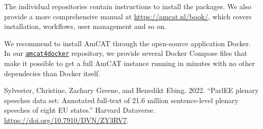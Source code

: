 \documentclass[
  a4paper,
  DIV=11,
  numbers=noendperiod]{scrartcl}
\newlength{\cslhangindent}
\newlength{\cslentryspacingunit} %
\newenvironment{CSLReferences}[2] %
 {%
  \setlength{\parindent}{0pt}
  \ifodd #1
  \let\oldpar\par
  \def\par{\hangindent=\cslhangindent\oldpar}
  \fi
  \setlength{\parskip}{#2\cslentryspacingunit}
 }%
 {}
\begin{document}
The individual repositories contain instructions to install the
packages. We also provide a more comprehensive manual at
\url{https://amcat.nl/book/}, which covers installation, workflows, user
management and so on.

We recommend to install AmCAT through the open-source application
Docker. In our
\href{https://github.com/ccs-amsterdam/amcat4docker}{\texttt{amcat4docker}}
repository, we provide several Docker Compose files that make it
possible to get a full AmCAT instance running in minutes with no other
dependecies than Docker itself.

\hypertarget{refs}{}
\begin{CSLReferences}{1}{0}
\leavevmode{}%
Sylvester, Christine, Zachary Greene, and Benedikt Ebing. 2022.
{``{ParlEE plenary speeches data set: Annotated full-text of 21.6
million sentence-level plenary speeches of eight EU states}.''} Harvard
Dataverse. \url{https://doi.org/10.7910/DVN/ZY3RV7}.

\end{CSLReferences}
\end{document}
